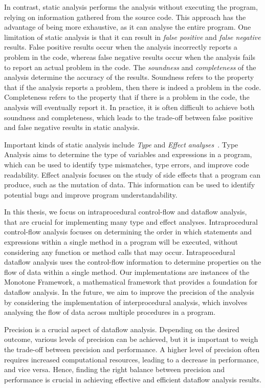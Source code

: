 In contrast, static analysis performs the analysis without executing the program,
relying on information gathered from the source code. This approach has
the advantage of being more exhaustive, as it can analyse the entire program. 
One limitation of static analysis is that it can result in \emph{false positive}
and \emph{false negative} results. False positive results occur when the analysis
incorrectly reports a problem in the code, whereas false negative results occur
when the analysis fails to report an actual problem in the code. The \emph{soundness} and
\emph{completeness} of the analysis determine the accuracy of the results. Soundness refers
to the property that if the analysis reports a problem, then there is indeed a
problem in the code.
Completeness refers to the property that if there is a problem
in the code, the analysis will eventually report it. In practice, it is often
difficult to achieve both soundness and completeness, which leads to the trade-off
between false positive and false negative results in static analysis.

Important kinds of static analysis include  \emph{Type}
and \emph{Effect analyses}~\cite{nielson1999type}.
Type Analysis aims to determine the type of variables and expressions
in a program, which can be used to identify type mismatches, type errors, and improve
code readability. Effect analysis focuses on the study of side effects that a program can
produce, such as the mutation of data. This information can be used to identify
potential bugs and improve program understandability.

In this thesis, we focus on intraprocedural control-flow and dataflow analysis,
that are crucial for implementing many type and effect analyses.
Intraprocedural control-flow analysis focuses on determining the order in which
statements and expressions within a single method in a program will be executed,
without considering any function or method calls that may occur.
Intraprocedural dataflow analysis uses the control-flow information to
determine properties on the flow of data within a single method.
Our implementations are instances of the Monotone Framework, a mathematical framework that provides a
foundation for dataflow analysis. In the future, we aim to improve the precision of the analysis
by considering the implementation of interprocedural analysis, which involves
analysing the flow of data across multiple procedures in a program.

Precision is a crucial aspect of dataflow analysis.
Depending on the desired outcome, various levels of precision can be achieved,
but it is important to weigh the trade-off between precision and performance.
A higher level of precision often requires increased computational resources,
leading to a decrease in performance, and vice versa. Hence, finding the right
balance between precision and performance is crucial in achieving effective and
efficient dataflow analysis results.

